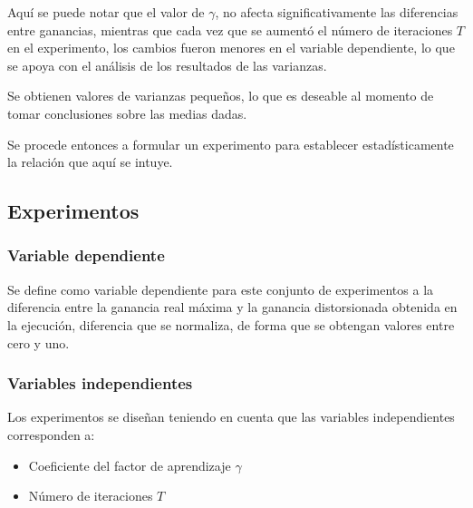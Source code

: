 Aquí se puede notar que el valor de $\gamma$, no afecta significativamente las diferencias entre ganancias, mientras que cada vez que se aumentó el número de iteraciones $T$ en el experimento, los cambios fueron menores en el variable dependiente, lo que se apoya con el análisis de los resultados de las varianzas.

Se obtienen valores de varianzas pequeños, lo que es deseable al momento de tomar conclusiones sobre las medias dadas.


Se procede entonces a formular un experimento para establecer estadísticamente la relación que aquí se intuye.


\subsection{Experimentos}

\subsubsection{Variable dependiente}

Se define como variable dependiente para este conjunto de experimentos a la diferencia entre la ganancia real máxima y la ganancia distorsionada obtenida en la ejecución, diferencia que se normaliza, de forma que se obtengan valores entre cero y uno.

\subsubsection{Variables independientes}
Los experimentos se diseñan teniendo en cuenta que las variables independientes corresponden a: 
\begin{itemize}
    \item Coeficiente del factor de aprendizaje $\gamma$
    \item Número de iteraciones $T$
\end{itemize}

